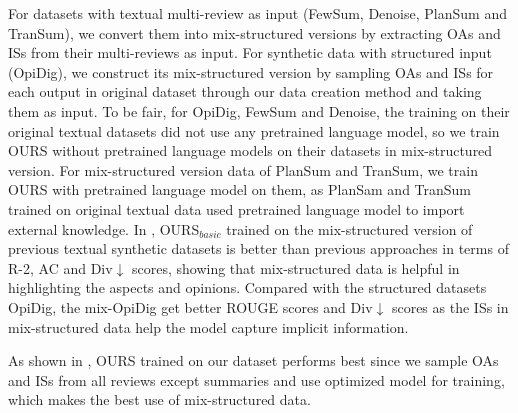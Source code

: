 For datasets with textual multi-review as input (FewSum, Denoise, PlanSum and TranSum), 
we convert them into mix-structured versions by extracting 
OAs and ISs
from their multi-reviews as input.
For synthetic data with structured input (OpiDig),
we construct its mix-structured version
by sampling OAs and ISs for each output in original dataset through our data creation method and taking them as input.
To be fair, for OpiDig, FewSum and Denoise,
the training on their original textual datasets did not use any pretrained language model,
so we train OURS without pretrained language models on their datasets in mix-structured version.
For mix-structured version data of PlanSum and TranSum,
we train OURS with pretrained language model on them,
as PlanSam and TranSum trained on original textual data used pretrained language model to import external knowledge.
In ,
OURS$_{basic}$ trained on the mix-structured version of previous textual synthetic datasets
is better than previous approaches in terms of R-2, AC and Div$\downarrow$ scores,
showing that mix-structured data
is helpful in highlighting the aspects and opinions.
Compared with the structured datasets OpiDig, the mix-OpiDig get better ROUGE scores and Div$\downarrow$ scores as the ISs in mix-structured data help the model capture implicit information.

As shown in , OURS trained on our dataset performs best since we sample OAs and ISs from all reviews except summaries and use optimized model for training,
which makes the best use of mix-structured data.


